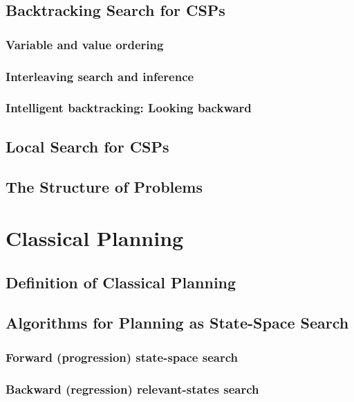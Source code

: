 \documentclass[11pt]{article}
\begin{document}
\subsection{Backtracking Search for CSPs}

\subsubsection{Variable and value ordering}

\subsubsection{Interleaving search and inference}

\subsubsection{Intelligent backtracking: Looking backward}

\subsection{Local Search for CSPs}

\subsection{The Structure of Problems}

\newpage
\setcounter{section}{9}
\section{Classical Planning}

\subsection{Definition of Classical Planning}


\subsection{Algorithms for Planning as State-Space Search}


\subsubsection{Forward (progression) state-space search}


\subsubsection{Backward (regression) relevant-states search}
\end{document}
